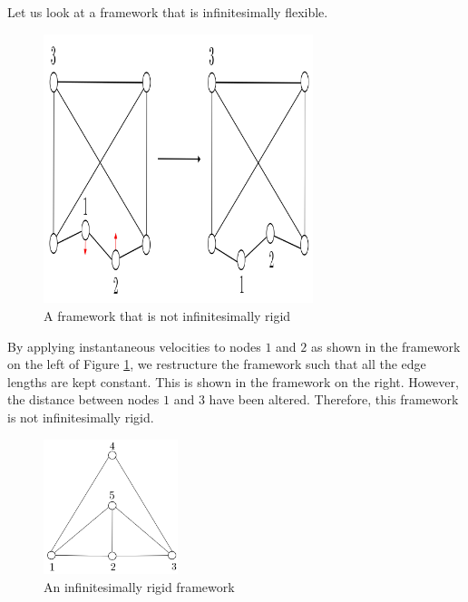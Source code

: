 \begin{example}
Let us look at a framework that is infinitesimally flexible.
\vspace{2mm}
\begin{figure}[htbp]
    \centering
    \includegraphics[width = 0.7\textwidth]{Chapter 2/10. not_inf_rigid_2.0.png}
    \caption{A framework that is not infinitesimally rigid}
    \label{eg: not inf rigid 2.0}
\end{figure}

\noindent
By applying instantaneous velocities to nodes $1$ and $2$ as shown in the framework on the left of Figure \ref{eg: not inf rigid 2.0}, we restructure the framework such that all the edge lengths are kept constant. This is shown in the framework on the right. However, the distance between nodes $1$ and $3$ have been altered. Therefore, this framework is not infinitesimally rigid.     

\begin{figure}[htbp]
    \centering
    \includegraphics[width = 0.35\textwidth]{Chapter 2/11. inf_rigid.png}
    \caption{An infinitesimally rigid framework}
    \label{eg: inf rigid}
\end{figure}


\end{example}
